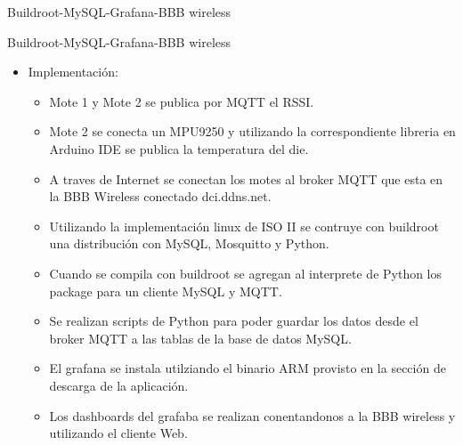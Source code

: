 \documentclass[aspectratio= 43]{beamer}
\begin{document}
\begin{frame}{Buildroot-MySQL-Grafana-BBB wireless}


\end{frame}

\begin{frame}{Buildroot-MySQL-Grafana-BBB wireless}
 \begin{itemize}
     \item{Implementación:}
      \begin{itemize}
               \item{Mote 1 y Mote 2 se publica por MQTT el RSSI.}
               \item{Mote 2 se conecta un MPU9250 y utilizando la correspondiente libreria en Arduino IDE se publica la temperatura del die.}
               \item{A traves de Internet se conectan los motes al broker MQTT que esta en la BBB Wireless conectado dci.ddns.net.}
	    \item{Utilizando la implementación linux de ISO II se contruye con buildroot una distribución con MySQL, Mosquitto y Python.}
	    \item{Cuando se compila con buildroot se agregan al interprete de Python los package para un cliente MySQL y MQTT.}
               \item{Se realizan scripts de Python para poder guardar los datos desde el broker MQTT a las tablas de la base de datos MySQL.}
               \item{El grafana se instala utilziando el binario ARM provisto en la sección de descarga de la aplicación.}
               \item{Los dashboards del grafaba se realizan conentandonos a la BBB wireless y utilizando el cliente Web.}
      \end{itemize}
  \end{itemize}
\end{frame}
\end{document}
